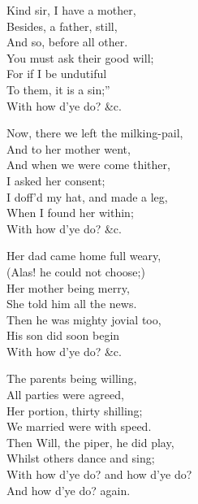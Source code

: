 \settowidth{\versewidth}{With how d’ye do? and how d’ye}
\begin{dcverse}\begin{altverse}
Kind sir, I have a mother,\\
Besides, a father, still,\\
And so, before all other.\\
You must ask their good will;\\
For if I be undutiful\\
To them, it is a sin;”\\
With how d’ye do? \&c.
\end{altverse}

\begin{altverse}
Now, there we left the milking-pail,\\
And to her mother went,\\
And when we were come thither,\\
I asked her consent;\\
I doff’d my hat, and made a leg,\\
When I found her within;\\
With how d’ye do? \&c.
\end{altverse}

\begin{altverse}
Her dad came home full weary,\\
(Alas! he could not choose;)\\
Her mother being merry,\\
She told him all the news.\\
Then he was mighty jovial too,\\
His son did soon begin\\
With how d’ye do? \&c.
\end{altverse}

\begin{altverse}
The parents being willing,\\
All parties were agreed,\\
Her portion, thirty shilling;\\
We married were with speed.\\
Then Will, the piper, he did play,\\
Whilst others dance and sing;\\
With how d’ye do? and how d’ye do?\\
And how d’ye do? again.
\end{altverse}
\end{dcverse}

